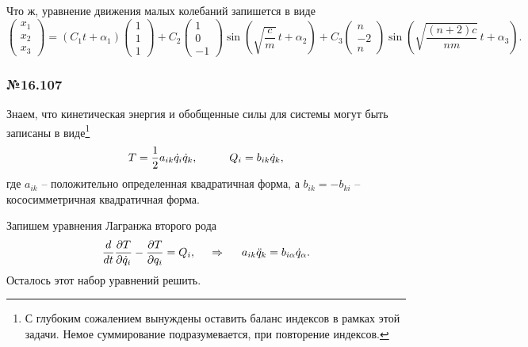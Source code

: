 Что ж, уравнение движения малых колебаний запишется в виде
\begin{equation*}
    \begin{pmatrix}
        x_1 \\ x_2 \\ x_3
    \end{pmatrix} = 
    (C_1 t + \alpha_1) \begin{pmatrix}
        1 \\ 1 \\ 1
    \end{pmatrix} + 
    C_2 \begin{pmatrix}
        1 \\ 0 \\ -1
    \end{pmatrix} 
    \sin \left(
        \sqrt{\frac{c}{m}} \, t + \alpha_2
    \right) + 
    C_3 \begin{pmatrix}
        n \\ -2 \\ n
    \end{pmatrix}
    \sin \left(
        \sqrt{\frac{(n+2)c}{nm}} \, t + \alpha_3
    \right).
\end{equation*}



\subsubsection*{№16.107}


Знаем, что кинетическая энергия и обобщенные силы для системы могут быть записаны в виде\footnote{
    С глубоким сожалением вынуждены оставить баланс индексов в рамках этой задачи. Немое суммирование подразумевается, при повторение индексов.
} 
\begin{equation*}
    T = \frac{1}{2} a_{ik} \dot{q}_i \dot{q}_k,
    \hspace{1 cm}
    Q_i = b_{ik} \dot{q}_k,
\end{equation*}
где $a_{ik}$ -- положительно определенная квадратичная форма, а $b_{ik} = - b_{ki}$ -- кососимметричная квадратичная форма. 

Запишем уравнения Лагранжа второго рода
\begin{equation*}
    \frac{d }{d t} \frac{\partial T}{\partial \dot{q}_i} - \frac{\partial T}{\partial q_i} = Q_i,
    \hspace{0.5cm} \Rightarrow \hspace{0.5cm}
    a_{ik} \ddot{q}_k = b_{i\alpha} \dot{q}_\alpha.
\end{equation*}
Осталось этот набор уравнений решить.



